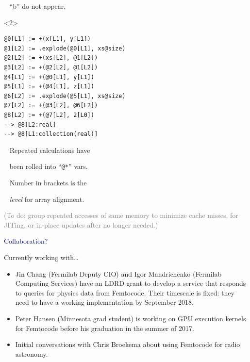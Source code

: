 \documentclass{beamer}
\begin{document}
\begin{frame}[fragile]{}
\begin{minipage}[t][12cm][t]{\textwidth}
\begin{onlyenv}
\mbox{ } \hfill ``b'' do not appear.

\vspace{6 cm}
\end{onlyenv}
\begin{onlyenv}<2>
\begin{lstlisting}[basicstyle=\ttfamily\small]
@0[L1] := +(x[L1], y[L1])
@1[L2] := .explode(@0[L1], xs@size)
@2[L2] := +(xs[L2], @1[L2])
@3[L2] := +(@2[L2], @1[L2])
@4[L1] := +(@0[L1], y[L1])
@5[L1] := +(@4[L1], z[L1])
@6[L2] := .explode(@5[L1], xs@size)
@7[L2] := +(@3[L2], @6[L2])
@8[L2] := +(@7[L2], 2[L0])
--> @8[L2:real]
--> @8[L1:collection(real)]
\end{lstlisting}
\vspace{-3.8 cm}
\normalsize
\mbox{ } \hfill Repeated calculations have

\mbox{ } \hfill been rolled into ``{\tt\small @*}'' vars.

\vspace{1.2 cm}
\mbox{ } \hfill Number in brackets is the

\mbox{ } \hfill {\it level} for array alignment.

\vspace{0.7 cm}
\textcolor{gray}{(To do: group repeated accesses of same memory to minimize cache misses, for JITing, or in-place updates after no longer needed.)}
\end{onlyenv}
\end{minipage}
\end{frame}

\begin{frame}{}
\begin{center}
\textcolor{darkblue}{\huge Collaboration?}
\end{center}
\end{frame}

\begin{frame}{Currently working with\ldots}
\vspace{0.5 cm}
\begin{itemize}\setlength{\itemsep}{0.5 cm}
\item Jin Chang (Fermilab Deputy CIO) and Igor Mandrichenko (Fermilab Computing Services) have an LDRD grant to develop a service that responds to queries for physics data from Femtocode. Their timescale is fixed: they need to have a working implementation by September 2018.

\item Peter Hansen (Minnesota grad student) is working on GPU execution kernels for Femtocode before his graduation in the summer of 2017.

\item Initial conversations with Chris Broekema about using Femtocode for radio astronomy.
\end{itemize}
\end{frame}
\end{document}

